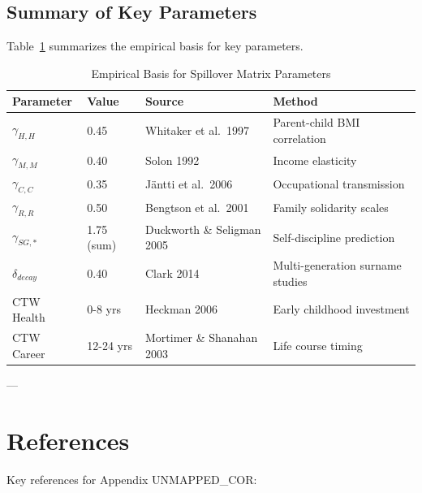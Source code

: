 \subsection{Summary of Key Parameters}

Table~\ref{tab:BI-literature-params} summarizes the empirical basis for key parameters.

\begin{table}[htbp]
\centering
\caption{Empirical Basis for Spillover Matrix Parameters}
\label{tab:BI-literature-params}
\renewcommand{\arraystretch}{1.2}
\small
\begin{tabular}{@{}llll@{}}
\toprule
\textbf{Parameter} & \textbf{Value} & \textbf{Source} & \textbf{Method} \\
\midrule
$\gamma_{H,H}$ & 0.45 & Whitaker et al.~1997 & Parent-child BMI correlation \\
$\gamma_{M,M}$ & 0.40 & Solon 1992 & Income elasticity \\
$\gamma_{C,C}$ & 0.35 & Jäntti et al.~2006 & Occupational transmission \\
$\gamma_{R,R}$ & 0.50 & Bengtson et al.~2001 & Family solidarity scales \\
$\gamma_{SG,*}$ & 1.75 (sum) & Duckworth \& Seligman 2005 & Self-discipline prediction \\
$\delta_{decay}$ & 0.40 & Clark 2014 & Multi-generation surname studies \\
CTW Health & 0-8 yrs & Heckman 2006 & Early childhood investment \\
CTW Career & 12-24 yrs & Mortimer \& Shanahan 2003 & Life course timing \\
\bottomrule
\end{tabular}
\end{table}

---

\section*{References}

\nocite{bcm_master}

Key references for Appendix UNMAPPED_COR:


